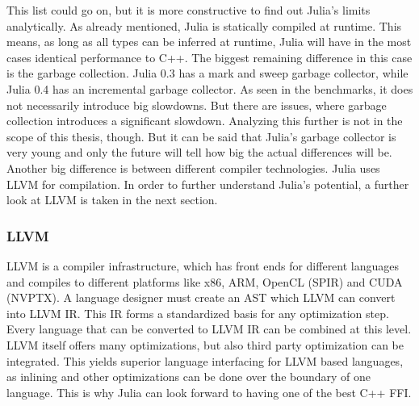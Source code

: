 This list could go on, but it is more constructive to find out Julia's limits analytically.
As already mentioned, Julia is statically compiled at runtime. This means, as long as all types can be inferred at runtime, Julia will have in the most cases identical performance to C++.
The biggest remaining difference in this case is the garbage collection. 
Julia 0.3 has a mark and sweep garbage collector, while Julia 0.4 has an incremental garbage collector.
As seen in the benchmarks, it does not necessarily introduce big slowdowns.
But there are issues, where garbage collection introduces a significant slowdown\cite{ReadDlmGC}.
Analyzing this further is not in the scope of this thesis, though. 
But it can be said that Julia's garbage collector is very young and only the future will tell how big the actual differences will be.
Another big difference is between different compiler technologies.
Julia uses \ac{LLVM}\cite{Lattner:MSThesis02} for compilation.
In order to further understand Julia's potential, a further look at \ac{LLVM} is taken in the next section.

\subsubsection{\ac{LLVM}}

\ac{LLVM} is a compiler infrastructure, which has front ends for different languages and compiles to different platforms like x86, ARM, \ac{OpenCL} (SPIR) and \ac{CUDA} (NVPTX). 
A language designer must create an \ac{AST} which \ac{LLVM} can convert into \ac{LLVM} \ac{IR}. This \ac{IR} forms a standardized basis for any optimization step. Every language that can be converted to \ac{LLVM} \ac{IR} can be combined at this level. \ac{LLVM} itself offers many optimizations, but also third party optimization can be integrated.
This yields superior language interfacing for \ac{LLVM} based languages, as inlining and other optimizations can be done over the boundary of one language.
This is why Julia can look forward to having one of the best C++ \ac{FFI}\cite{Cxx}.


